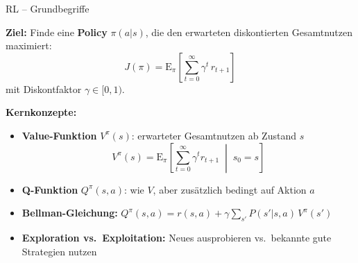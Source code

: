 \documentclass[%
  aspectratio=169,
  10pt
]{beamer}
\newcommand{\hl}[1]{{\color{fbblau}\textbf{#1}}}
\begin{document}
\begin{frame}{RL -- Grundbegriffe}

\textbf{Ziel:} Finde eine \hl{Policy} $\pi(a|s)$, die den erwarteten
diskontierten Gesamtnutzen maximiert:
\[
  J(\pi) = \mathrm{E}_\pi\!\left[\sum_{t=0}^{\infty} \gamma^t\, r_{t+1}\right]
\]
mit Diskontfaktor $\gamma \in [0,1)$.

\vspace{3mm}
\textbf{Kernkonzepte:}
\begin{itemize}
  \item \textbf{Value-Funktion} $V^\pi(s)$: erwarteter Gesamtnutzen ab Zustand $s$
        \[
          V^\pi(s) = \mathrm{E}_\pi\!\left[\sum_{t=0}^\infty \gamma^t r_{t+1} \;\middle|\; s_0 = s\right]
        \]
  \item \textbf{Q-Funktion} $Q^\pi(s,a)$: wie $V$, aber zusätzlich bedingt auf Aktion $a$
  \item \textbf{Bellman-Gleichung:}
        $Q^\pi(s,a) = r(s,a) + \gamma \sum_{s'} P(s'|s,a)\,V^\pi(s')$
  \item \textbf{Exploration vs.\ Exploitation:}
        Neues ausprobieren vs.\ bekannte gute Strategien nutzen
\end{itemize}

\end{frame}
\end{document}
